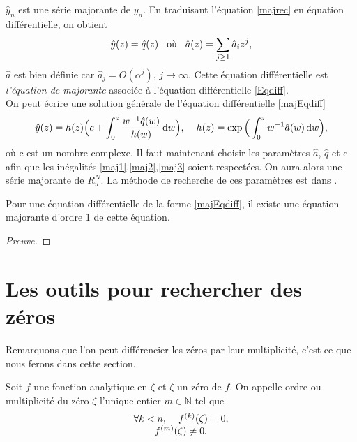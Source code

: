 \documentclass[a4paper,10pt]{article}
\begin{document}
	$\hat{y}_n$ est une série majorante de $y_n$. En traduisant l'équation \eqref{majrec} en équation différentielle, on obtient
	\begin{equation}
	[\theta-\hat{a}(z)] \hat{y}(z) = \hat{q}(z) \hspace{3mm} \text{où} \hspace{3mm} \hat{a}(z)=\sum_{j \geq 1} \hat{a}_iz^j,
	\label{majEqdiff}
	\end{equation}
	$\hat{a}$ est bien définie car $\hat{a}_j=O(\alpha^j)$, $j \rightarrow \infty$. Cette équation différentielle est \textit{l'équation de majorante} associée à l'équation différentielle \eqref{Eqdiff}.\\
	On peut écrire une solution générale de l'équation différentielle \eqref{majEqdiff} 
	\begin{equation}
	\hat{y}(z)=h(z)\Big(c+\int_{0}^{z}\frac{w^{-1}\hat{q}(w)}{h(w)}\, \mathrm{d}w\Big), \hspace{4mm} h(z)=\exp\Big(\int_{0}^{z}w^{-1}\hat{a}(w)\, \mathrm{d}w\Big),
	\end{equation}
	où c est un nombre complexe. Il faut maintenant choisir les paramètres $\hat{a}$, $\hat{q}$ et c afin que les inégalités \eqref{maj1},\eqref{maj2},\eqref{maj3} soient respectées. On aura alors une série majorante de $R_u^{N}$. La méthode de recherche de ces paramètres est dans \cite{Mezzarobba2019}.
	
	\begin{proposition}
		Pour une équation différentielle de la forme \eqref{majEqdiff}, il existe une équation majorante d'ordre 1 de cette équation.
		\label{Majord1}  
	\end{proposition}
	\begin{proof}[Preuve]
		
	\end{proof}
	
	
	
	\section{Les outils pour rechercher des zéros}
	\label{sec:outils}
	Remarquons que l'on peut différencier les zéros par leur multiplicité, c'est ce que nous ferons dans cette section.
	
	\begin{definition}
		Soit $f$ une fonction analytique en $\zeta$ et $\zeta$ un zéro de $f$. On appelle ordre ou multiplicité du zéro $\zeta$ l'unique entier $m \in \mathbb{N}$ tel que 
		\begin{equation}
		\begin{array}{ccc}
		\forall k<n, \hspace{4mm} f^{(k)}(\zeta)=0,\\
		f^{(m)}(\zeta)\neq 0.
		\end{array}
		\end{equation}
		\label{multiplicité}
	\end{definition}
	
\end{document}
